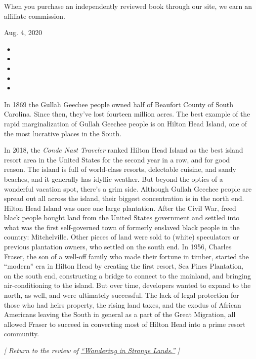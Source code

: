When you purchase an independently reviewed book through our site, we
earn an affiliate commission.

Aug. 4, 2020

\begin{itemize}
\item
\item
\item
\item
\item
\end{itemize}

In 1869 the Gullah Geechee people owned half of Beaufort County of South
Carolina. Since then, they've lost fourteen million acres. The best
example of the rapid marginalization of Gullah Geechee people is on
Hilton Head Island, one of the most lucrative places in the South.

In 2018, the \emph{Conde Nast Traveler} ranked Hilton Head Island as the
best island resort area in the United States for the second year in a
row, and for good reason. The island is full of world-class resorts,
delectable cuisine, and sandy beaches, and it generally has idyllic
weather. But beyond the optics of a wonderful vacation spot, there's a
grim side. Although Gullah Geechee people are spread out all across the
island, their biggest concentration is in the north end. Hilton Head
Island was once one large plantation. After the Civil War, freed black
people bought land from the United States government and settled into
what was the first self-governed town of formerly enslaved black people
in the country: Mitchelville. Other pieces of land were sold to (white)
speculators or previous plantation owners, who settled on the south end.
In 1956, Charles Fraser, the son of a well-off family who made their
fortune in timber, started the ``modern'' era in Hilton Head by creating
the first resort, Sea Pines Plantation, on the south end, constructing a
bridge to connect to the mainland, and bringing air-conditioning to the
island. But over time, developers wanted to expand to the north, as
well, and were ultimately successful. The lack of legal protection for
those who had heirs property, the rising land taxes, and the exodus of
African Americans leaving the South in general as a part of the Great
Migration, all allowed Fraser to succeed in converting most of Hilton
Head into a prime resort community.

\emph{{[} Return to the review of}
\href{https://www.nytimes3xbfgragh.onion/2020/08/03/books/review/wandering-in-strange-lands-morgan-jerkins.html}{\emph{``Wandering
in Strange Lands.''}} \emph{{]}}

